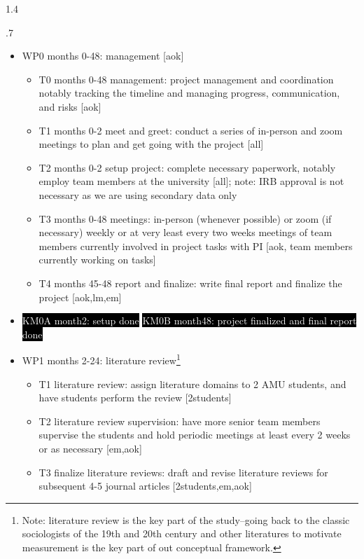 \documentclass[10pt, letterpaper]{article}
\begin{document}
\begin{spacing}{1.4}
\begin{spacing}{.7}
\begin{itemize}
\item WP0 months 0-48: management [aok] 
  \begin{itemize} 
  \item T0 months 0-48 management: project management and coordination  notably tracking the timeline
    and managing progress, communication, and risks [aok]
  \item T1 months 0-2 meet and greet: conduct a series of in-person and zoom
    meetings to plan and get going with the project [all] 
  \item T2 months 0-2 setup project: complete necessary paperwork, notably employ team members at the
    university [all]; note: IRB approval is not necessary as we are using
    secondary data only
  \item T3 months 0-48 meetings: in-person (whenever possible) or zoom (if necessary) weekly or at very
    least every two weeks meetings of team members currently involved in project
    tasks with PI [aok, team members currently working on tasks]
  \item T4 months 45-48 report and finalize: write final report and finalize the project [aok,lm,em]
  \end{itemize}
\item \colorbox{black}{\textcolor{white}{KM0A month2: setup done}}
  \colorbox{black}{\textcolor{white}{KM0B month48: project finalized and final report done}} 
\item WP1 months 2-24: literature review\footnote{Note: literature review is the
  key part of the study--going back to the classic sociologists of the 19th and
  20th century and other literatures to motivate measurement is the key part of out conceptual framework.}
  \begin{itemize}
  \item T1 literature review: assign literature domains to 2 AMU students, and have students
    perform the review [2students]
  \item T2 literature review supervision: have more senior team members 
    supervise the students and hold periodic meetings at least every 2 weeks or as necessary [em,aok]
  \item T3 finalize literature reviews: draft and revise literature reviews for
    subsequent 4-5 journal articles [2students,em,aok] 
  \end{itemize}

\end{itemize}
\end{spacing}
\end{spacing}
\end{document}
